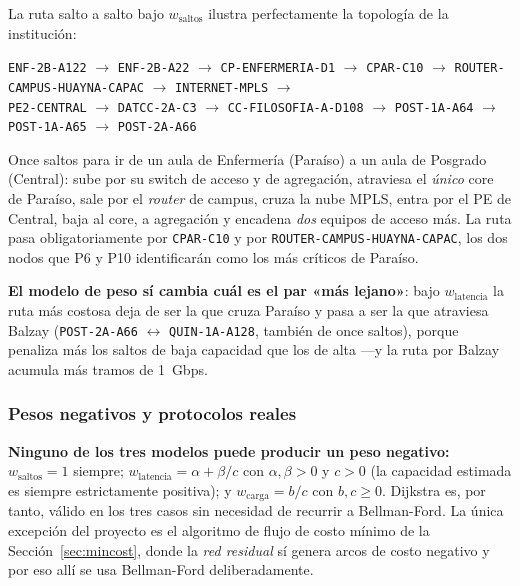 \documentclass[10pt,a4paper]{extarticle}
\newcommand{\code}[1]{\texttt{\small #1}}
\begin{document}
La ruta salto a salto bajo $w_{\text{saltos}}$ ilustra perfectamente la topología de la
institución:

\begin{center}\small
\code{ENF-2B-A122} $\to$ \code{ENF-2B-A22} $\to$ \code{CP-ENFERMERIA-D1} $\to$
\code{CPAR-C10} $\to$ \code{ROUTER-CAMPUS-HUAYNA-CAPAC} $\to$ \code{INTERNET-MPLS} $\to$\\
\code{PE2-CENTRAL} $\to$ \code{DATCC-2A-C3} $\to$ \code{CC-FILOSOFIA-A-D108} $\to$
\code{POST-1A-A64} $\to$ \code{POST-1A-A65} $\to$ \code{POST-2A-A66}
\end{center}

Once saltos para ir de un aula de Enfermería (Paraíso) a un aula de Posgrado (Central):
sube por su switch de acceso y de agregación, atraviesa el \textit{único} core de Paraíso,
sale por el \textit{router} de campus, cruza la nube MPLS, entra por el PE de Central, baja
al core, a agregación y encadena \textit{dos} equipos de acceso más. La ruta pasa
obligatoriamente por \code{CPAR-C10} y por \code{ROUTER-CAMPUS-HUAYNA-CAPAC}, los dos nodos
que P6 y P10 identificarán como los más críticos de Paraíso.

\textbf{El modelo de peso sí cambia cuál es el par «más lejano»}: bajo
$w_{\text{latencia}}$ la ruta más costosa deja de ser la que cruza Paraíso y pasa a ser la
que atraviesa Balzay (\code{POST-2A-A66} $\leftrightarrow$ \code{QUIN-1A-A128}, también de
once saltos), porque penaliza más los saltos de baja capacidad que los de alta ---y la ruta
por Balzay acumula más tramos de 1~Gbps.

\subsubsection{Pesos negativos y protocolos reales}

\textbf{Ninguno de los tres modelos puede producir un peso negativo:}
$w_{\text{saltos}} = 1$ siempre; $w_{\text{latencia}} = \alpha + \beta/c$ con
$\alpha, \beta > 0$ y $c > 0$ (la capacidad estimada es siempre estrictamente positiva); y
$w_{\text{carga}} = b/c$ con $b, c \ge 0$. Dijkstra es, por tanto, válido en los tres casos
sin necesidad de recurrir a Bellman-Ford. La única excepción del proyecto es el algoritmo de
flujo de costo mínimo de la Sección~\ref{sec:mincost}, donde la \textit{red residual} sí
genera arcos de costo negativo y por eso allí se usa Bellman-Ford deliberadamente.
\end{document}
